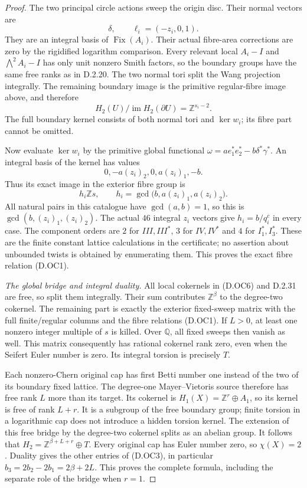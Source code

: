 \begin{proof}
The two principal circle actions sweep the origin disc.
Their normal vectors are
\[
 \delta,\qquad \ell_i=(-z_i,0,1).
\]
They are an integral basis of $\operatorname{Fix}(A_i)$.
Their actual fibre-area corrections are zero by the
rigidified logarithm comparison. Every relevant local
$A_i-I$ and $\bigwedge^2 A_i-I$ has only unit nonzero Smith
factors, so the boundary groups have the same free ranks
as in D.2.20. The two normal tori split the Wang projection
integrally. The remaining boundary image is the primitive
regular-fibre image above, and therefore
\[
 H_2(U)/\operatorname{im}H_2(\partial U)
                        =\mathbb Z^{s_i-2}.                \tag{D.OC6}
\]
The full boundary kernel consists of both normal tori and
$\ker w_i$; its fibre part cannot be omitted.

Now evaluate $\ker w_i$ by the primitive global functional
$\omega=a e_1^*e_2^*-b\delta^*\gamma^*$.
An integral basis of the kernel has values
\[
 0,-a(z_i)_2,0,a(z_i)_1,-b.
\]
Thus its exact image in the exterior fibre group is
\[
 h_i\mathbb Zs,\qquad
 h_i=\gcd\bigl(b,a(z_i)_1,a(z_i)_2\bigr).
                                                               \tag{D.OC7}
\]
All natural pairs in this catalogue have $\gcd(a,b)=1$,
so this is $\gcd(b,(z_i)_1,(z_i)_2)$.
The actual $46$ integral $z_i$ vectors give
$h_i=b/q_i^c$ in every case. The component orders are
$2$ for $III,III^*$, $3$ for $IV,IV^*$ and $4$ for
$I_1^*,I_3^*$. These are the finite constant lattice
calculations in the certificate; no assertion about
unbounded twists is obtained by enumerating them.
This proves the exact fibre relation (D.OC1).

\emph{The global bridge and integral duality.}
All local cokernels in (D.OC6) and D.2.31 are free,
so split them integrally. Their sum contributes
$\mathbb Z^\beta$ to the degree-two cokernel.
The remaining part is exactly the exterior fixed-sweep
matrix with the full finite/regular columns and the fibre
relations (D.OC1). If $L>0$, at least one nonzero integer
multiple of $s$ is killed. Over $\mathbb Q$, all fixed
sweeps then vanish as well. This matrix consequently has
rational cokernel rank zero, even when the Seifert Euler
number is zero. Its integral torsion is precisely $T$.

Each nonzero-Chern original cap has first Betti number
one instead of the two of its boundary fixed lattice.
The degree-one Mayer--Vietoris source therefore has free
rank $L$ more than its target. Its cokernel is
$H_1(X)=\mathbb Z^r\oplus A_1$, so its kernel is free of
rank $L+r$. It is a subgroup of the free boundary group;
finite torsion in a logarithmic cap does not introduce a
hidden torsion kernel. The extension of this free bridge
by the degree-two cokernel splits as an abelian group.
It follows that
$H_2=\mathbb Z^{\beta+L+r}\oplus T$.
Every original cap has Euler number zero, so $\chi(X)=2$.
Duality gives the other entries of (D.OC3), in particular
$b_3=2b_2-2b_1=2\beta+2L$.
This proves the complete formula, including the separate
role of the bridge when $r=1$.


\end{proof}
